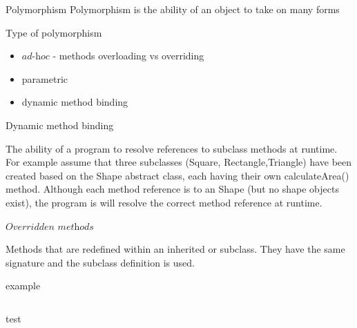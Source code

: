 \documentclass[a4paper, 11pt]{beamer}
\begin{document}
\begin{frame}{Polymorphism}
Polymorphism is the ability of an object to take on many forms
\end{frame}

\begin{frame} { Type of polymorphism }

\begin{itemize}
\item $\textit{ad-hoc}$ - methods overloading vs overriding
\item parametric
\item dynamic method binding
\end{itemize}

\end{frame}

\begin{frame}{Dynamic method binding}

The ability of a program to resolve references to subclass methods at runtime. For example assume that three subclasses (Square, Rectangle,Triangle) have been created based on the Shape abstract class, each having their own calculateArea() method. Although each method reference is to an Shape (but no shape objects exist), the program is will resolve the correct method reference at runtime.

\end{frame}

\begin{frame}{$\textit{Overridden methods}$}

Methods that are redefined within an inherited or subclass. They have the same signature and the subclass definition is used.

\end{frame}

\begin{frame}{example}
\inputminted[bgcolor=bg, fontsize=\tiny]{java}{./src/overriding/Polygon.java}
\end{frame}


\begin{frame}{test}

\begin{columns}
    \begin{column}{.3\linewidth}
      \inputminted[bgcolor=bg, fontsize=\tiny]{java}{./src/overriding/Polygon.java}        
    \end{column}
\vline
    \begin{column}{.5\linewidth}
       \inputminted[bgcolor=bg, fontsize=\tiny]{java}{./src/overriding/PolygonTest.java}
   
    \end{column}
  \end{columns}
\end{frame}
\end{document}
